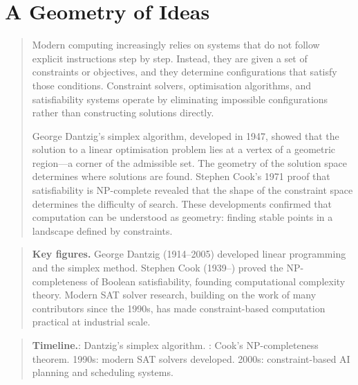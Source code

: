 \documentclass[11pt]{book}
\theoremstyle{plain}
\theoremstyle{definition}
\theoremstyle{remark}
\newenvironment{historicalpreamble}
  {\begin{quote}\small}
  {\end{quote}}
\newenvironment{historicalfigures}
  {\begin{quote}\small\textbf{Key figures.}\enspace\ignorespaces}
  {\end{quote}}
\newenvironment{paradigmtimeline}
  {\begin{quote}\small\textbf{Timeline.}\enspace\ignorespaces}
  {\end{quote}}
\begin{document}
\chapter{A Geometry of Ideas}

\begin{historicalpreamble}
Modern computing increasingly relies on systems that do not follow
explicit instructions step by step. Instead, they are given a set of
constraints or objectives, and they determine configurations that satisfy
those conditions. Constraint solvers, optimisation algorithms, and
satisfiability systems operate by eliminating impossible configurations
rather than constructing solutions directly.

George Dantzig's simplex algorithm, developed in 1947, showed that the
solution to a linear optimisation problem lies at a vertex of a
geometric region---a corner of the admissible set. The geometry of the
solution space determines where solutions are found. Stephen Cook's 1971
proof that satisfiability is NP-complete revealed that the shape of the
constraint space determines the difficulty of search. These developments
confirmed that computation can be understood as geometry: finding stable
points in a landscape defined by constraints.
\end{historicalpreamble}

\begin{historicalfigures}
George Dantzig (1914--2005) developed linear programming and the simplex
method. Stephen Cook (1939--) proved the NP-completeness of Boolean
satisfiability, founding computational complexity theory. Modern SAT
solver research, building on the work of many contributors since the
1990s, has made constraint-based computation practical at industrial
scale.
\end{historicalfigures}

\begin{paradigmtimeline}
1947: Dantzig's simplex algorithm. : Cook's NP-completeness theorem. \quad
1990s: modern SAT solvers developed. \quad
2000s: constraint-based AI planning and scheduling systems.
\end{paradigmtimeline}
\end{document}
